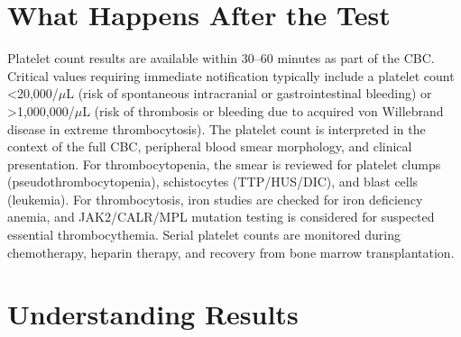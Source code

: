 \section*{What Happens After the Test}
Platelet count results are available within 30--60 minutes as part of the CBC. Critical values requiring immediate notification typically include a platelet count <20,000/$\mu$L (risk of spontaneous intracranial or gastrointestinal bleeding) or >1,000,000/$\mu$L (risk of thrombosis or bleeding due to acquired von Willebrand disease in extreme thrombocytosis). The platelet count is interpreted in the context of the full CBC, peripheral blood smear morphology, and clinical presentation. For thrombocytopenia, the smear is reviewed for platelet clumps (pseudothrombocytopenia), schistocytes (TTP/HUS/DIC), and blast cells (leukemia). For thrombocytosis, iron studies are checked for iron deficiency anemia, and JAK2/CALR/MPL mutation testing is considered for suspected essential thrombocythemia. Serial platelet counts are monitored during chemotherapy, heparin therapy, and recovery from bone marrow transplantation.

\section*{Understanding Results}

